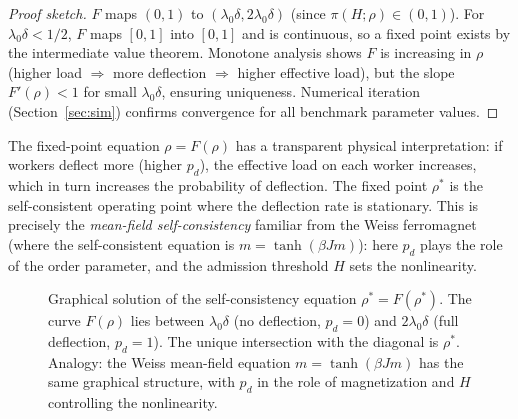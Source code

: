 \documentclass[11pt,a4paper]{article}
\begin{document}
\begin{proof}[Proof sketch]
$F$ maps $(0,1)$ to $(\lambda_0\delta, 2\lambda_0\delta)$
(since $\pi(H;\rho) \in (0,1)$).  For $\lambda_0\delta < 1/2$,
$F$ maps $[0,1]$ into $[0,1]$ and is continuous, so a fixed point
exists by the intermediate value theorem.  Monotone analysis shows
$F$ is increasing in $\rho$ (higher load $\Rightarrow$ more
deflection $\Rightarrow$ higher effective load), but the slope
$F'(\rho) < 1$ for small $\lambda_0\delta$, ensuring uniqueness.
Numerical iteration (Section~\ref{sec:sim}) confirms convergence
for all benchmark parameter values.
\end{proof}

The fixed-point equation $\rho = F(\rho)$ has a transparent
physical interpretation: if workers deflect more (higher $p_d$),
the effective load on each worker increases, which in turn
increases the probability of deflection.  The fixed point
$\rho^*$ is the self-consistent operating point where the
deflection rate is stationary.  This is precisely the
\emph{mean-field self-consistency} familiar from the Weiss
ferromagnet (where the self-consistent equation is
$m = \tanh(\beta J m)$): here $p_d$ plays the role of the
order parameter, and the admission threshold $H$ sets the
nonlinearity.

\begin{figure}[h]
\centering
{}
\caption{Graphical solution of the self-consistency equation
$\rho^* = F(\rho^*)$.  The curve $F(\rho)$ lies between
$\lambda_0\delta$ (no deflection, $p_d=0$) and $2\lambda_0\delta$
(full deflection, $p_d=1$).  The unique intersection with the
diagonal is $\rho^*$.  Analogy: the Weiss mean-field equation
$m = \tanh(\beta J m)$ has the same graphical structure, with
$p_d$ in the role of magnetization and $H$ controlling the
nonlinearity.}
\label{fig:sc}
\end{figure}
\end{document}
